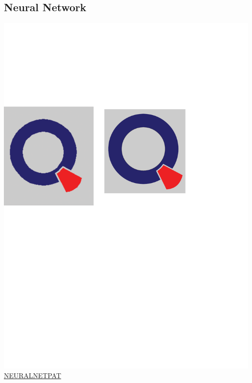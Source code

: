 \documentclass[12pt, a4paper, bibliography=totoc, english]{scrartcl}
\begin{document}
\subsection{Neural Network}
\includegraphics[scale=0.08]{qletlogo}
\textcolor{blue}{\href{https://github.com/JingyiLiu3136/MLFBM/blob/master/NEURALNETPAT/SPL_NEURALNETPAT.R}{NEURALNETPAT}}
\end{document}
